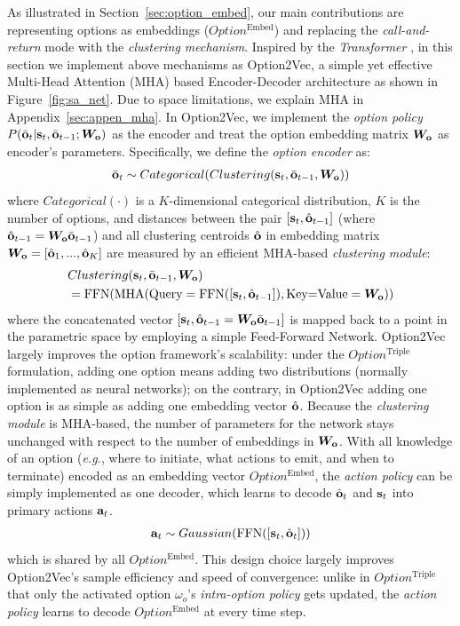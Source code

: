 \documentclass[10pt,journal,compsoc]{IEEEtran}
\renewcommand{\cite}{\citep}
\begin{document}
As illustrated in Section~\ref{sec:option_embed}, our main
contributions are representing options as embeddings ($Option^{\textrm{Embed}}$) and
replacing the \emph{call-and-return} mode with the
\emph{clustering mechanism}. Inspired by the \emph{Transformer}
\cite{vaswani2017attention}, in this section we 
implement above mechanisms as Option2Vec, a simple yet
effective Multi-Head Attention (MHA) \cite{vaswani2017attention}
based Encoder-Decoder architecture as shown in Figure~\ref{fig:sa_net}. Due
to space limitations, we explain MHA in
Appendix~\ref{sec:appen_mha}.
In Option2Vec, we implement the \emph{option
  policy} $P(\bar{{\mathbf{o}}}_t|{\mathbf{s}}_t,\bar{{\mathbf{o}}}_{t-1};{\bm{W}}_{{\mathbf{o}}})$ as
the encoder and treat the option embedding matrix ${\bm{W}}_{{\mathbf{o}}}$ as
encoder's parameters. Specifically, we define the \emph{option
  encoder} as:
\begin{align}
  \label{eq:net_encoder}
  \bar{\rvo}_t\sim Categorical(Clustering(\rvs_t,\bar{\rvo}_{t-1},\mW_{\rvo}))
\end{align}
where $Categorical(\cdot)$ is a $K$-dimensional categorical distribution, $K$ is the number of options, and distances between the pair $[{\mathbf{s}}_t,\hat{{\mathbf{o}}}_{t-1}]$ (where $\hat{{\mathbf{o}}}_{t-1}={\bm{W}}_{{\mathbf{o}}}\bar{{\mathbf{o}}}_{t-1}$) and
all clustering centroids $\hat{{\mathbf{o}}}$ in embedding matrix ${\bm{W}}_{{\mathbf{o}}}=[\hat{{\mathbf{o}}}_1,...,\hat{{\mathbf{o}}}_K]$ are measured by an
efficient MHA-based \emph{clustering module}:
\begin{align}
  \label{eq:net_encoder}
  &Clustering(\rvs_t,\bar{\rvo}_{t-1},\mW_{\rvo})\nonumber\\
  &=\text{FFN}(\text{MHA}(\text{Query}=\text{FFN}([\rvs_t,\hat{\rvo}_{t-1}]),
\text{Key=Value}=\mW_{\rvo}))
\end{align}
where the concatenated vector $[{\mathbf{s}}_t,\hat{{\mathbf{o}}}_{t-1}={\bm{W}}_{{\mathbf{o}}}\bar{{\mathbf{o}}}_{t-1}]$ is
mapped back to a point in the parametric space by employing a
simple Feed-Forward Network. Option2Vec largely improves the
option framework's scalability: under the $Option^{\textrm{Triple}}$
formulation, adding one option means adding two distributions
(normally implemented as neural networks); on the contrary, in
Option2Vec adding one option is as simple as adding one embedding
vector $\hat{{\mathbf{o}}}$. Because the \emph{clustering module} is
MHA-based, the number of parameters for the network stays unchanged
with respect to the number of embeddings in ${\bm{W}}_{{\mathbf{o}}}$.
With all knowledge of an option (\textit{e.g.}, where to initiate, what
actions to emit, and when to terminate) encoded as an embedding vector $Option^{\textrm{Embed}}$, the
\emph{action policy} can be simply implemented as one decoder,
which learns to decode $\hat{{\mathbf{o}}}_t$ and ${\mathbf{s}}_t$ into primary
actions ${\mathbf{a}}_t$.
\begin{align}
  \label{eq:sa_net_action_sample}
  \rva_t \sim Gaussian(\text{FFN}([\rvs_t,\hat{\rvo}_{t}]))
\end{align}
which is shared by all $Option^{\textrm{Embed}}$. This design choice
largely improves Option2Vec's sample efficiency and speed of
convergence: unlike in $Option^{\textrm{Triple}}$ that only the activated
option $\omega_o$'s \emph{intra-option policy} gets updated, the
\emph{action policy} learns to decode $Option^{\textrm{Embed}}$ at every
time step.
\end{document}
